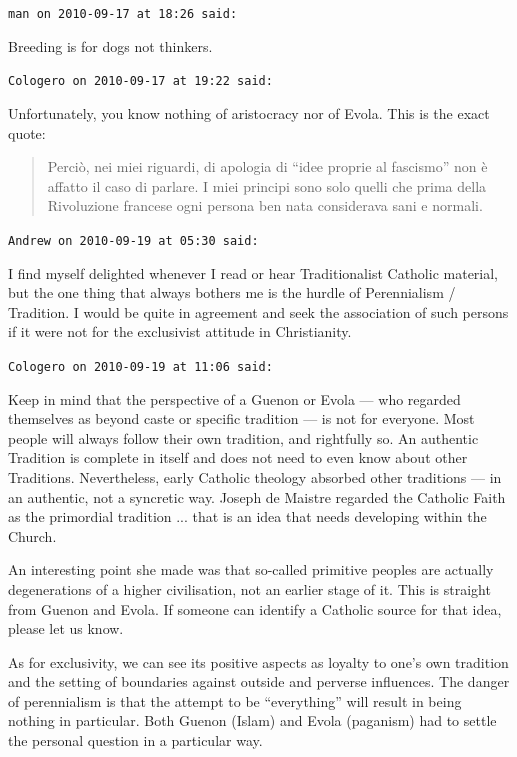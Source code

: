 \begin{footnotesize}
\begin{sffamily}
\texttt{man on 2010-09-17 at 18:26 said:}

Breeding is for dogs not thinkers.

\hfill

\texttt{Cologero on 2010-09-17 at 19:22 said:}

Unfortunately, you know nothing of aristocracy nor of Evola. This is the exact quote:

\begin{quote}\footnotesize
Perciò, nei miei riguardi, di apologia di ``idee proprie al fascismo'' non è affatto il caso di parlare. I miei principi sono solo quelli che prima della Rivoluzione francese ogni persona ben nata considerava sani e normali.
\end{quote}


\hfill

\texttt{Andrew on 2010-09-19 at 05:30 said:}

I find myself delighted whenever I read or hear Traditionalist Catholic material, but the one thing that always bothers me is the hurdle of Perennialism / Tradition. I would be quite in agreement and seek the association of such persons if it were not for the exclusivist attitude in Christianity.

\hfill

\texttt{Cologero on 2010-09-19 at 11:06 said:}

Keep in mind that the perspective of a Guenon or Evola --- who regarded themselves as beyond caste or specific tradition --- is not for everyone. Most people will always follow their own tradition, and rightfully so. An authentic Tradition is complete in itself and does not need to even know about other Traditions. Nevertheless, early Catholic theology absorbed other traditions --- in an authentic, not a syncretic way. Joseph de Maistre regarded the Catholic Faith as the primordial tradition ... that is an idea that needs developing within the Church.

An interesting point she made was that so-called primitive peoples are actually degenerations of a higher civilisation, not an earlier stage of it. This is straight from Guenon and Evola. If someone can identify a Catholic source for that idea, please let us know.

As for exclusivity, we can see its positive aspects as loyalty to one's own tradition and the setting of boundaries against outside and perverse influences. The danger of perennialism is that the attempt to be ``everything'' will result in being nothing in particular. Both Guenon (Islam) and Evola (paganism) had to settle the personal question in a particular way.


\end{sffamily}
\end{footnotesize}
